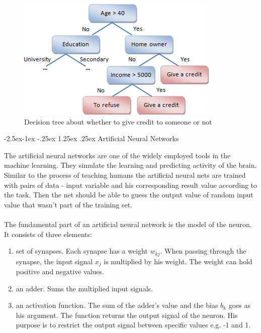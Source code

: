 \documentclass[runningheads,a4paper]{llncs}[2015/06/24]
\makeatletter
\renewcommand\paragraph{\@startsection{paragraph}{4}{\z@}%
            {-2.5ex\@plus -1ex \@minus -.25ex}%
            {1.25ex \@plus .25ex}%
            {\normalfont\normalsize\bfseries}}
\makeatother
\begin{document}
\begin{figure}[h]
\centering
\includegraphics[width=\textwidth]{decisionTree}
\caption{Decision tree about whether to give credit to someone or not}
\label{fig:decisionTree}
\end{figure}
		 
\paragraph{Artificial Neural Networks}
	
The artificial neural networks are one of the widely employed tools in the machine learning. They simulate the learning and predicting activity of the brain. Similar to the process of teaching humans the artificial neural nets are trained with pairs of data - input variable and his corresponding result value according to the task. Then the net should be able to guess the output value of random input value that wasn't part of the training set. \\\\The  fundamental part of an artificial neural network is the model of the neuron. It consists of three elements\cite{haykin2009neural}:
\vspace{-\topsep}
\begin{enumerate}
\item set of synapses. Each synapse has a weight $w_{kj}$.  When passing through the synapse, the input signal $x_j$ is multiplied by his weight. The weight can hold positive and negative values.
\item an adder. Sums the multiplied input signals. 
\item an activation function. The sum of the adder's value and the bias $b_k$ goes as his argument. The function returns the output signal of the neuron. His purpose is to restrict the output signal between specific values e.g. -1 and 1.
\end{enumerate}
\vspace{-\topsep}
\end{document}
